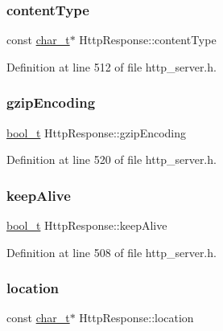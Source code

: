 \subsubsection{\texorpdfstring{content\+Type}{contentType}}
{\footnotesize\ttfamily const \hyperlink{compiler__port_8h_a40bb5262bf908c328fbcfbe5d29d0201}{char\+\_\+t}$\ast$ Http\+Response\+::content\+Type}



Definition at line 512 of file http\+\_\+server.\+h.

\mbox{\label{structHttpResponse_a20c4f097750e6246a191c16d135a183a}} 
\subsubsection{\texorpdfstring{gzip\+Encoding}{gzipEncoding}}
{\footnotesize\ttfamily \hyperlink{compiler__port_8h_a812d16e5494522586b3784e55d479912}{bool\+\_\+t} Http\+Response\+::gzip\+Encoding}



Definition at line 520 of file http\+\_\+server.\+h.

\mbox{\label{structHttpResponse_ae4aed74270561d53c2d0f7b8b7a5ac18}} 
\subsubsection{\texorpdfstring{keep\+Alive}{keepAlive}}
{\footnotesize\ttfamily \hyperlink{compiler__port_8h_a812d16e5494522586b3784e55d479912}{bool\+\_\+t} Http\+Response\+::keep\+Alive}



Definition at line 508 of file http\+\_\+server.\+h.

\mbox{\label{structHttpResponse_aad108bd91274637be13ab0399b247e59}} 
\subsubsection{\texorpdfstring{location}{location}}
{\footnotesize\ttfamily const \hyperlink{compiler__port_8h_a40bb5262bf908c328fbcfbe5d29d0201}{char\+\_\+t}$\ast$ Http\+Response\+::location}



